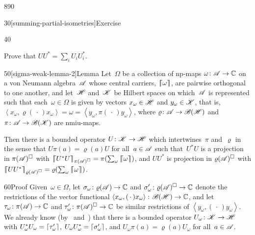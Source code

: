 \begin{parsec}{890}
\begin{point}{30}[summing-partial-isometries]{Exercise}
\begin{point}{40}
\begin{enumerate}
Prove that $UU^* = \sum_i U_iU_i^*$.
\end{enumerate}
\spacingfix%
\end{point}%
\end{point}%
\begin{point}{50}[sigma-weak-lemma-2]{Lemma}%
Let~$\Omega$ be a collection of np-maps $\omega\colon \mathscr{A}\to\mathbb{C}$
on a von Neumann algebra~$\mathscr{A}$ 
whose central carriers,  $\left\lceil\!\!\left\lceil\omega\right\rceil\!\!\right\rceil$, are pairwise orthogonal to one another,
and let~$\mathscr{H}$ and~$\mathscr{K}$ be Hilbert spaces
on which~$\mathscr{A}$ is represented such
that each~$\omega\in\Omega$ 
is given by vectors $x_\omega\in\mathscr{H}$ and $y_\omega\in\mathscr{K}$,
that is,
$\left<x_\omega,\varrho(\,\cdot\,)x_\omega\right>
=\omega = \left<y_\omega,\pi(\,\cdot\,)y_\omega\right>$,
where $\varrho\colon \mathscr{A}\to\mathscr{B}(\mathscr{H})$
and $\pi\colon \mathscr{A}\to\mathscr{B}(\mathscr{K})$
are nmiu-maps.

Then there is a bounded operator $U\colon \mathscr{K}\to\mathscr{H}$
which intertwines~$\pi$ and~$\varrho$
in the sense that $U \pi(a)=\varrho(a) U$
for all~$a\in \mathscr{A}$
such that~$U^*U$
is a projection in
$\pi(\mathscr{A})^\square$
with
$\cceil{U^*U}_{\pi(\scrA)^\square}=\pi(\sum_\omega \cceil{\omega})$,
and 
$UU^*$
is projection in
$\varrho(\mathscr{A})^\square$
with
$\cceil{UU^*}_{\varrho(\scrA)^\square}=\varrho(\sum_\omega \cceil{\omega})$.
\begin{point}{60}{Proof}%
Given~$\omega\in\Omega$,
let $\sigma_\omega\colon \varrho(\mathscr{A})\to \mathbb{C}$
and $\sigma_\omega'\colon \varrho(\mathscr{A})^\square\to\mathbb{C}$
denote the restrictions
of the vector functional $\left<x_\omega,(\,\cdot\,)x_\omega\right>
\colon \mathscr{B}(\mathscr{H})\to\mathbb{C}$,
and let  $\tau_\omega\colon \pi(\mathscr{A})\to \mathbb{C}$
and $\tau_\omega'\colon \pi(\mathscr{A})^\square\to\mathbb{C}$
be similar restrictions
of $\left<y_\omega,(\,\cdot\,)y_\omega\right>$.
We already know (by~
and~)
that
there is
a bounded operator $U_\omega\colon \mathscr{K}\to\mathscr{H}$
with $U_\omega^*U_\omega = \left\lceil\tau_\omega'\right\rceil$,
$U_\omega U_\omega^* = \left\lceil\sigma_\omega'\right\rceil$,
and $U_\omega \pi(a) = \varrho(a) U_\omega$
for all~$a\in\mathscr{A}$.


\end{point}
\end{point}
\end{parsec}
